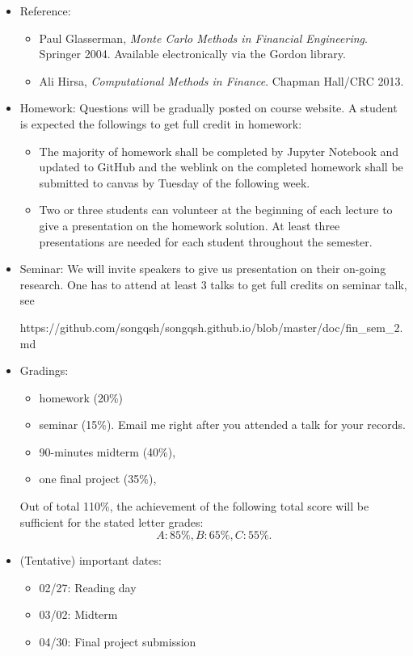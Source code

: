 \documentclass[11pt]{amsart}
\begin{document}
\begin{itemize}
\item Reference:
\begin{itemize}
\item Paul Glasserman, \textit{Monte Carlo Methods in Financial Engineering}. Springer 2004. Available electronically via the Gordon library.
 \item Ali Hirsa, \textit{Computational Methods in Finance}. Chapman Hall/CRC 2013. 
\end{itemize}

\item Homework: 
Questions will be gradually 
posted on course website. 
A student is expected the followings to get full credit in homework:
\begin{itemize}
\item The majority of homework shall be completed by Jupyter Notebook and updated to GitHub and the weblink on the completed homework shall be submitted to canvas by Tuesday of the following week.
\item Two or three students can volunteer 
at the beginning of each lecture
to give a  presentation 
on the homework solution. 
At least three presentations are needed for each student 
throughout the semester.
\end{itemize}

\item Seminar:
We will invite speakers to give us presentation on their 
on-going research. One has to attend at least 3 talks to get full credits on seminar talk, see 

https://github.com/songqsh/songqsh.github.io/blob/master/doc/fin\_sem\_2.md



\item Gradings:
\begin{itemize}
 \item
 homework (20\%)
 \item seminar (15\%). Email me right after you attended a talk for your records.
 \item 
 90-minutes midterm (40\%), 
 \item one final project (35\%), 
\end{itemize}
Out of total 110\%, the achievement of the following total score will be sufficient for the stated letter grades:
$$A: 85\%, B: 65\%, C: 55\%.$$

\item (Tentative) important dates:
\begin{itemize}
 \item 02/27: Reading day
 \item 03/02: Midterm
 \item 04/30: Final project submission
\end{itemize}


\end{itemize}
\end{document}
